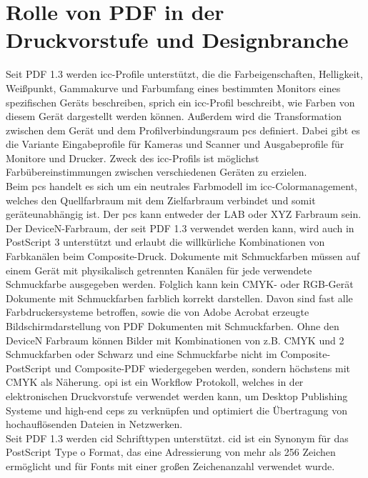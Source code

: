 \section{Rolle von PDF in der Druckvorstufe und Designbranche}
Seit PDF 1.3 werden \gls{icc}-Profile unterstützt, die die Farbeigenschaften, Helligkeit, Weißpunkt, Gammakurve und Farbumfang eines bestimmten Monitors eines spezifischen Geräts beschreiben, sprich ein \gls{icc}-Profil beschreibt, wie Farben von diesem Gerät dargestellt werden können. Außerdem wird die Transformation zwischen dem Gerät und dem Profilverbindungsraum \gls{pcs} definiert. Dabei gibt es die Variante Eingabeprofile für Kameras und Scanner und Ausgabeprofile für Monitore und Drucker. Zweck des \gls{icc}-Profils ist möglichst Farbübereinstimmungen zwischen verschiedenen Geräten zu erzielen. \cite{benq} \\
Beim \gls{pcs} handelt es sich um ein neutrales Farbmodell im \gls{icc}-Colormanagement, welches den Quellfarbraum mit dem Zielfarbraum verbindet und somit geräteunabhängig ist. Der \gls{pcs} kann entweder der LAB oder XYZ Farbraum sein. \cite{prepress} \\
Der DeviceN-Farbraum, der seit PDF 1.3 verwendet werden kann, wird auch in PostScript 3 unterstützt und erlaubt die willkürliche Kombinationen von Farbkanälen beim Composite-Druck. Dokumente mit Schmuckfarben müssen auf einem Gerät mit physikalisch getrennten Kanälen für jede verwendete Schmuckfarbe ausgegeben werden. Folglich kann kein CMYK- oder RGB-Gerät Dokumente mit Schmuckfarben farblich korrekt darstellen. Davon sind fast alle Farbdruckersysteme betroffen, sowie die von Adobe Acrobat erzeugte Bildschirmdarstellung von PDF Dokumenten mit Schmuckfarben. Ohne den DeviceN Farbraum können Bilder mit Kombinationen von z.B. CMYK und 2 Schmuckfarben oder Schwarz und eine Schmuckfarbe nicht im Composite-PostScript und Composite-PDF wiedergegeben werden, sondern höchstens mit CMYK als Näherung. \cite{helios} \gls{opi} ist ein Workflow Protokoll, welches in der elektronischen Druckvorstufe verwendet werden kann, um Desktop Publishing Systeme und high-end \gls{ceps} zu verknüpfen und optimiert die Übertragung von hochauflösenden Dateien in Netzwerken. \cite{printwiki} \\
Seit PDF 1.3 werden \gls{cid} Schrifttypen unterstützt. \gls{cid} ist ein Synonym für das PostScript Type o Format, das eine Adressierung von mehr als 256 Zeichen ermöglicht und für Fonts mit einer großen Zeichenanzahl verwendet wurde. \cite{typoinfo}

